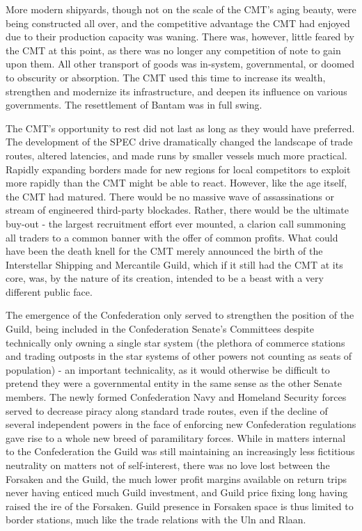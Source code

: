 More modern shipyards, though not on the scale of the CMT's aging
beauty, were being constructed all over, and the competitive advantage
the CMT had enjoyed due to their production capacity was waning. There
was, however, little feared by the CMT at this point, as there was no
longer any competition of note to gain upon them. All other transport
of goods was in-system, governmental, or doomed to obscurity or
absorption. The CMT used this time to increase its wealth, strengthen
and modernize its infrastructure, and deepen its influence on various
governments. The resettlement of Bantam was in full swing.

The CMT's opportunity to rest did not last as long as they would have
preferred. The development of the SPEC drive dramatically changed the
landscape of trade routes, altered latencies, and made runs by smaller
vessels much more practical. Rapidly expanding borders made for new
regions for local competitors to exploit more rapidly than the CMT
might be able to react. However, like the age itself, the CMT had
matured. There would be no massive wave of assassinations or stream of
engineered third-party blockades. Rather, there would be the ultimate
buy-out - the largest recruitment effort ever mounted, a clarion call
summoning all traders to a common banner with the offer of common
profits. What could have been the death knell for the CMT merely
announced the birth of the Interstellar Shipping and Mercantile Guild,
which if it still had the CMT at its core, was, by the nature of its
creation, intended to be a beast with a very different public face.

The emergence of the Confederation only served to strengthen the
position of the Guild, being included in the Confederation Senate's
Committees despite technically only owning a single star system (the
plethora of commerce stations and trading outposts in the star systems
of other powers not counting as seats of population) - an important
technicality, as it would otherwise be difficult to pretend they were
a governmental entity in the same sense as the other Senate
members. The newly formed Confederation Navy and Homeland Security
forces served to decrease piracy along standard trade routes, even if
the decline of several independent powers in the face of enforcing new
Confederation regulations gave rise to a whole new breed of
paramilitary forces. While in matters internal to the Confederation
the Guild was still maintaining an increasingly less fictitious
neutrality on matters not of self-interest, there was no love lost
between the Forsaken and the Guild, the much lower profit margins
available on return trips never having enticed much Guild investment,
and Guild price fixing long having raised the ire of the
Forsaken. Guild presence in Forsaken space is thus limited to border
stations, much like the trade relations with the Uln and Rlaan.

